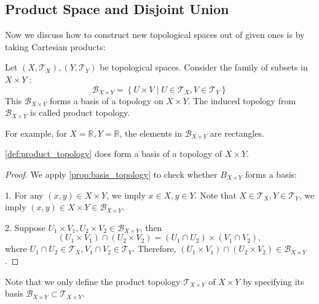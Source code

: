 \subsection{Product Space and Disjoint Union}

Now we discuss how to construct new topological spaces out of given ones is by taking Cartesian products:

\begin{definition} \label{def:product_topology} Let \(\left({X,{\mathcal{T}}_X}\right),\left({Y,{\mathcal{T}}_Y}\right)\) be topological spaces. Consider the family of subsets in \(X \times  Y\) :
\[
{\mathcal{B}}_{X \times  Y} = \left\{  {U \times  V \mid  U \in  {\mathcal{T}}_X,V \in  {\mathcal{T}}_Y}\right\}
\]
This \({\mathcal{B}}_{X \times  Y}\) forms a basis of a topology on \(X \times  Y\). The induced topology from \({\mathcal{B}}_{X \times  Y}\) is called product topology.
\end{definition}

For example, for \(X = \mathbb{R},Y = \mathbb{R}\), the elements in \({\mathcal{B}}_{X \times  Y}\) are rectangles.

\begin{proposition}
\autoref{def:product_topology} does form a basis of a topology of $X \times Y$.    
\end{proposition}

\begin{proof}
We apply \autoref{prop:basis_topology} to check whether \({B}_{X \times  Y}\) forms a basis:

1. For any \(\left({x,y}\right)  \in  X \times  Y\), we imply \(x \in  X,y \in  Y\). Note that \(X \in  {\mathcal{T}}_X,Y \in  {\mathcal{T}}_Y\), we imply \(\left({x,y}\right)  \in  X \times  Y \in  {\mathcal{B}}_{X \times  Y}\).

2. Suppose \({U}_{1} \times  {V}_{1},{U}_{2} \times  {V}_{2} \in  {\mathcal{B}}_{X \times  Y}\), then
\[
\left({{U}_{1} \times  {V}_{1}}\right)  \cap  \left({{U}_{2} \times  {V}_{2}}\right)  = \left({{U}_{1} \cap  {U}_{2}}\right)  \times  \left({{V}_{1} \cap  {V}_{2}}\right),
\]
where \({U}_{1} \cap  {U}_{2} \in  {\mathcal{T}}_X,{V}_{1} \cap  {V}_{2} \in  {\mathcal{T}}_Y\). Therefore, \(\left({{U}_{1} \times  {V}_{1}}\right)  \cap  \left({{U}_{2} \times  {V}_{2}}\right)  \in  {\mathcal{B}}_{X \times  Y}\).
\end{proof}

Note that we only define the product topology $\mathcal{T}_{X \times Y}$ of $X \times Y$ by specifying its basis $\mathcal{B}_{X \times Y} \subset \mathcal{T}_{X \times Y}$. 

